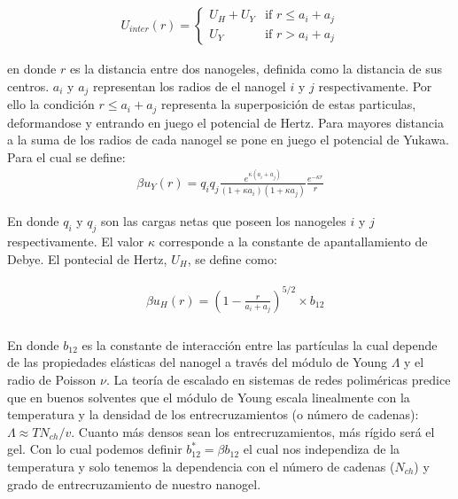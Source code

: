 \begin{align}
	U_{inter}(r) = \begin{cases} U_H + U_Y & \text{if } r \leq a_i + a_j \\ U_Y & \text{if } r > a_i + a_j \end{cases} 
	\label{eq:HY-potential}
\end{align}

en donde $r$ es la distancia entre dos nanogeles, definida como la distancia de sus centros. 
$a_i$ y $a_j$ representan los radios de el nanogel $i$ y $j$ respectivamente. Por ello la condici\'on $r \leq a_i +a_j$ representa la superposici\'on de estas particulas, deformandose y entrando en juego el potencial de Hertz.
Para mayores distancia a la suma de los radios de cada nanogel se pone en juego el potencial de Yukawa. Para el cual se define:
\begin{align}
	\beta u_Y(r) = q_i q_j \frac{e^{\kappa(a_i + a_j)}}{(1 +\kappa a_i)(1 + \kappa a_j)} \frac{e^{-\kappa r}}{r} 
	\label{eq:yukawa}
\end{align}

En donde $q_i$ y $q_j$ son las cargas netas que poseen los nanogeles $i$ y $j$ respectivamente. El valor $\kappa$ corresponde a la constante de apantallamiento de Debye. 
El pontecial de Hertz, $U_H$, se define como:
 

\begin{align}
	\begin{aligned}
		& \beta u_H (r) = \left(1-\frac{r}{a_i + a_j}\right)^{5/2}\times b_{12} \\
	\end{aligned}
\end{align}


En donde $b_{12}$ es la constante de interacci\'on entre las part\'iculas la cual depende de las propiedades el\'asticas del nanogel a trav\'es del m\'odulo de Young $\Lambda$ y el radio de Poisson $\nu$. \addcite[landau] La teor\'ia de escalado en sistemas de redes polim\'ericas predice que en buenos solventes \addcite que el m\'odulo de Young  escala linealmente con la temperatura y la densidad de los entrecruzamientos (o n\'umero de cadenas): $\Lambda \approx TN_{ch}/v$. Cuanto m\'as densos sean los entrecruzamientos, m\'as r\'igido ser\'a el gel.
Con lo cual podemos definir $b_{12}^\ast = \beta b_{12}$ el cual nos independiza de la temperatura y solo tenemos la dependencia con el n\'umero de cadenas ($N_{ch}$) y grado de entrecruzamiento de nuestro nanogel. 




